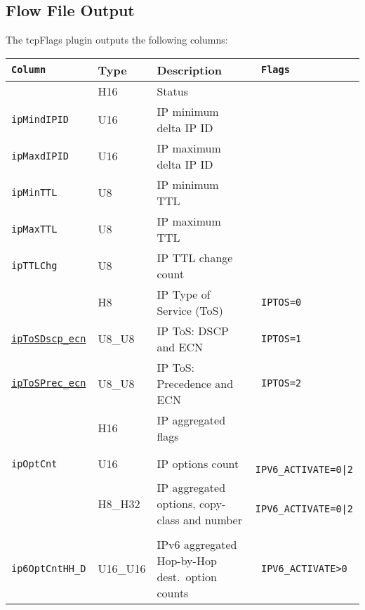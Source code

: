 \documentclass[documentation]{subfiles}
\begin{document}
\subsection{Flow File Output}
The tcpFlags plugin outputs the following columns:
\begin{longtable}{>{\tt}lll>{\tt\small}l}
    \toprule
    {\bf Column}                     & {\bf Type} & {\bf Description}                                     & {\bf Flags}\\
    \midrule\endhead%
    \nameref{tcpFStat}               & H16        & Status                                                & \\
    ipMindIPID                       & U16        & IP minimum delta IP ID                                & \\
    ipMaxdIPID                       & U16        & IP maximum delta IP ID                                & \\
    ipMinTTL                         & U8         & IP minimum TTL                                        & \\
    ipMaxTTL                         & U8         & IP maximum TTL                                        & \\
    ipTTLChg                         & U8         & IP TTL change count                                   & \\
    \nameref{ipToS}                  & H8         & IP Type of Service (ToS)                              & IPTOS=0\\
    \hyperref[ipToS]{ipToSDscp\_ecn} & U8\_U8     & IP ToS: DSCP and ECN                                  & IPTOS=1\\
    \hyperref[ipToS]{ipToSPrec\_ecn} & U8\_U8     & IP ToS: Precedence and ECN                            & IPTOS=2\\
    \nameref{ipFlags}                & H16        & IP aggregated flags                                   & \\
    \\
    ipOptCnt                         & U16        & IP options count                                      & IPV6\_ACTIVATE=0|2\\
    \nameref{ipOptCpClNum}           & H8\_H32    & IP aggregated options, copy-class and number          & IPV6\_ACTIVATE=0|2\\
    \\
    ip6OptCntHH\_D                   & U16\_U16   & IPv6 aggregated Hop-by-Hop dest.\ option counts       & IPV6\_ACTIVATE>0\\

\end{longtable}
\end{document}
